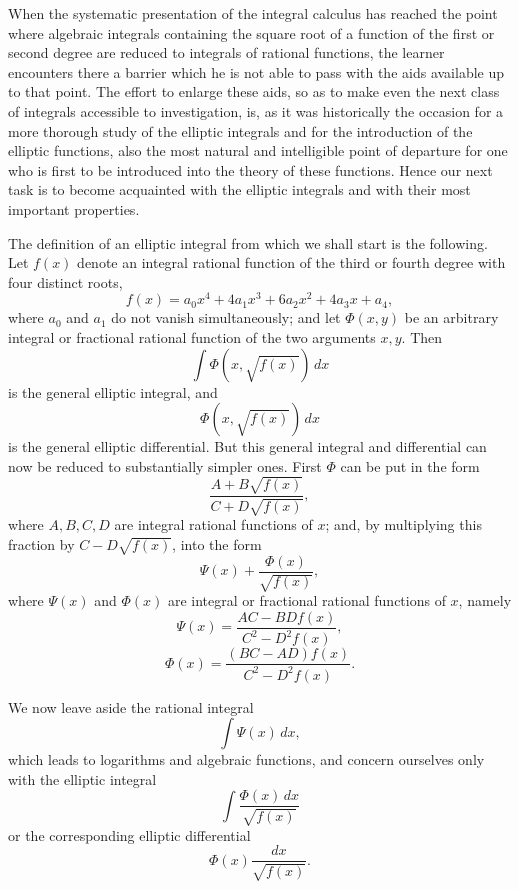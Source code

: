 \documentclass[11pt]{article}
\begin{document}
When the systematic presentation of the integral calculus has reached the point where algebraic integrals containing the square root of a function of the first or second degree are reduced to integrals of rational functions, the learner encounters there a barrier which he is not able to pass with the aids available up to that point. The effort to enlarge these aids, so as to make even the next class of integrals accessible to investigation, is, as it was historically the occasion for a more thorough study of the elliptic integrals and for the introduction of the elliptic functions, also the most natural and intelligible point of departure for one who is first to be introduced into the theory of these functions. Hence our next task is to become acquainted with the elliptic integrals and with their most important properties.

The definition of an elliptic integral from which we shall start is the following. Let $f(x)$ denote an integral rational function of the third or fourth degree with four distinct roots,
\begin{equation}
f(x)=a_0x^4+4a_1x^3+6a_2x^2+4a_3x+a_4,
\tag{1}
\end{equation}
where $a_0$ and $a_1$ do not vanish simultaneously; and let $\Phi(x,y)$ be an arbitrary integral or fractional rational function of the two arguments $x,y$. Then
\[
\int \Phi(x,\sqrt{f(x)})\,dx
\]
is the general elliptic integral, and
\[
\Phi(x,\sqrt{f(x)})\,dx
\]
is the general elliptic differential. But this general integral and differential can now be reduced to substantially simpler ones. First $\Phi$ can be put in the form
\[
\frac{A+B\sqrt{f(x)}}{C+D\sqrt{f(x)}},
\]
where $A,B,C,D$ are integral rational functions of $x$; and, by multiplying this fraction by $C-D\sqrt{f(x)}$, into the form
\[
\Psi(x)+\frac{\Phi(x)}{\sqrt{f(x)}},
\]
where $\Psi(x)$ and $\Phi(x)$ are integral or fractional rational functions of $x$, namely
\[
\Psi(x)=\frac{AC-BD f(x)}{C^2-D^2 f(x)},
\]
\[
\Phi(x)=\frac{(BC-AD)f(x)}{C^2-D^2 f(x)}.
\]

We now leave aside the rational integral
\[
\int \Psi(x)\,dx,
\]
which leads to logarithms and algebraic functions, and concern ourselves only with the elliptic integral
\begin{equation}
\int \frac{\Phi(x)\,dx}{\sqrt{f(x)}}
\tag{2}
\end{equation}
or the corresponding elliptic differential
\begin{equation}
\Phi(x)\frac{dx}{\sqrt{f(x)}}.
\tag{3}
\end{equation}
\end{document}
